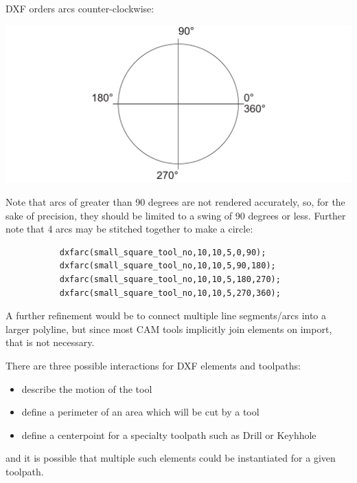 \documentclass{ltxdoc}
\begin{document}
DXF orders arcs counter-clockwise:

\noindent\includegraphics[width=\linewidth]{images/arcs_circle_degrees.pdf}%

Note that arcs of greater than 90 degrees are not rendered accurately, so, for the sake of
precision, they should be limited to a swing of 90 degrees or less. Further note that 4 arcs
may be stitched together to make a circle:
 
\begin{verbatim}
           dxfarc(small_square_tool_no,10,10,5,0,90);
           dxfarc(small_square_tool_no,10,10,5,90,180);
           dxfarc(small_square_tool_no,10,10,5,180,270);
           dxfarc(small_square_tool_no,10,10,5,270,360);
\end{verbatim}
 
A further refinement would be to connect multiple line segments/arcs into a larger polyline, 
but since most CAM tools implicitly join elements on import, that is not necessary.
 
There are three possible interactions for DXF elements and toolpaths:

\begin{itemize}
 \item describe the motion of the tool
 \item define a perimeter of an area which will be cut by a tool
 \item define a centerpoint for a specialty toolpath such as Drill or Keyhhole
\end{itemize}
 
\noindent and it is possible that multiple such elements could be instantiated for
a given toolpath.
 
\end{document}

